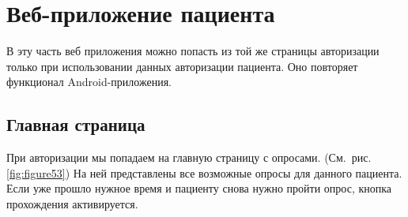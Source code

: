 \section{Веб-приложение пациента}\label{sec:-211}

В эту часть веб приложения можно попасть из той же страницы авторизации только при использовании данных авторизации пациента.
Оно повторяет функционал Android-приложения.

\subsection{Главная страница}\label{subsec:-212}
При авторизации мы попадаем на главную страницу с опросами.
(См.\ рис. \ref{fig:figure53})
На ней представлены все возможные опросы для данного пациента.
Если уже прошло нужное время и пациенту снова нужно пройти опрос, кнопка прохождения активируется.
